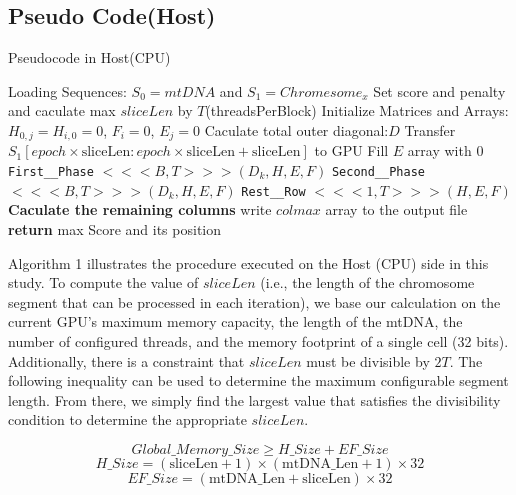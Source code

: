 \documentclass[PhD]{PHlab-thesis}
\begin{document}
\subsection{Pseudo Code(Host)}

\begin{algorithm}
\caption{Pseudocode in Host(CPU)}
\begin{algorithmic}[1]
    \State Loading Sequences: $S_0= mtDNA$ and $S_1 = Chromesome_x$
    \State Set score and penalty and caculate max $sliceLen$ by $T$(threadsPerBlock) 
    \State Initialize Matrices and Arrays: $H_{0,j} = H_{i,0} = 0$, $F_i = 0$, $E_j = 0$
    \State Caculate total outer diagonal:$D$
        \State Transfer $S_1[epoch \times \text{sliceLen} : epoch \times \text{sliceLen} + \text{sliceLen}]$ to GPU
        \State Fill $E$ array with $0$
            \State \texttt{First\_\_Phase} $<<< B, T>>>(D_k, H, E, F)$
            \State \texttt{Second\_\_Phase} $<<<B, T>>>(D_k, H, E, F)$
        \EndFor
        \State \texttt{Rest\_\_Row} $<<<1, T>>>(H, E, F)$
    \EndFor
    \State \textbf{Caculate the remaining columns}
    \State write $colmax$ array to the output file
    \State \textbf{return} max Score and its position 
\EndProcedure
\end{algorithmic}
\end{algorithm}

Algorithm 1 illustrates the procedure executed on the Host (CPU) side in this study. To compute the value of $sliceLen$ (i.e., the length of the chromosome segment that can be processed in each iteration), we base our calculation on the current GPU's maximum memory capacity, the length of the mtDNA, the number of configured threads, and the memory footprint of a single cell (32 bits). Additionally, there is a constraint that $sliceLen$ must be divisible by $2T$. The following inequality can be used to determine the maximum configurable segment length. From there, we simply find the largest value that satisfies the divisibility condition to determine the appropriate $sliceLen$.

\[
Global\_Memory\_Size \ge H\_Size + EF\_Size 
\]
\[
H\_Size = (\text{sliceLen} + 1)\times(\text{mtDNA\_Len} + 1) \times 32
\]
\[
EF\_Size = (\text{mtDNA\_Len} + \text{sliceLen}) \times 32
\]
\end{document}

